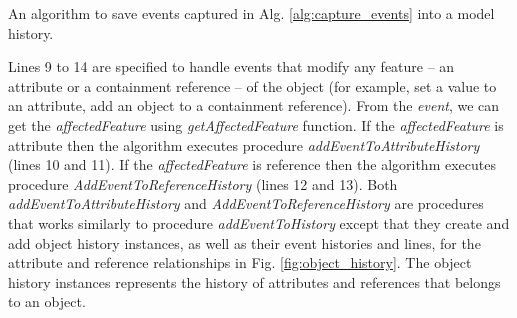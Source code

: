\documentclass{llncs}
\begin{document}
\begin{algorithm}
\begin{small}
\end{small}
\caption{An algorithm to save events captured in Alg. \ref{alg:capture_events} into a model history.}
\label{alg:fill_history}
\end{algorithm}

Lines 9 to 14 are specified to handle events that modify any feature -- an attribute or a containment reference -- of the object (for example, set a value to an attribute, add an object to a containment reference). From the \emph{event}, we can get the \emph{affectedFeature} using \emph{getAffectedFeature} function. If the \emph{affectedFeature} is attribute then the algorithm executes procedure \emph{addEventToAttributeHistory} (lines 10 and 11). If the \emph{affectedFeature} is reference then the algorithm executes procedure \emph{AddEventToReferenceHistory} (lines 12 and 13). Both \emph{addEventToAttributeHistory} and \emph{AddEventToReferenceHistory} are procedures that works similarly to procedure \emph{addEventToHistory} except that they create and add object history instances, as well as their event histories and lines, for the attribute and reference relationships in Fig. \ref{fig:object_history}. The object history instances represents the history of attributes and references that belongs to an object.
\end{document}
